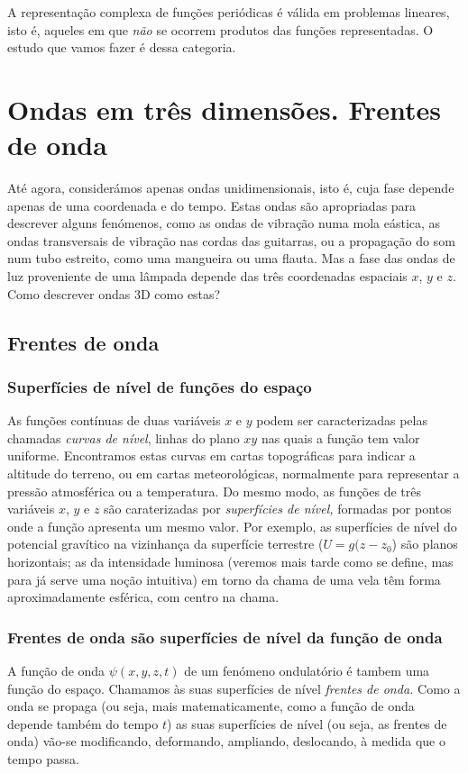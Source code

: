 A representação complexa de funções periódicas é válida em problemas lineares,
isto é, aqueles em que \emph{não} se ocorrem produtos das funções representadas.
O estudo que vamos fazer é dessa categoria.

\section{Ondas em três dimensões. Frentes de onda}
Até agora, considerámos apenas ondas unidimensionais, isto é, cuja fase depende
apenas de uma coordenada e do tempo. Estas ondas são apropriadas para descrever
alguns fenómenos, como as ondas de vibração numa mola eástica, as ondas
transversais de vibração nas cordas das guitarras, ou a propagação do som num
tubo estreito, como uma mangueira ou uma flauta. Mas a fase das ondas de luz
proveniente de uma lâmpada depende das três coordenadas espaciais $x$, $y$ e
$z$. Como descrever ondas 3D como estas?



\subsection{Frentes de onda}
\subsubsection*{Superfícies de nível de funções do espaço}
As funções contínuas de duas variáveis $x$ e $y$ podem ser caracterizadas pelas
chamadas \emph{curvas de nível}, linhas do plano $xy$ nas quais a função tem
valor uniforme. Encontramos estas curvas em cartas topográficas para indicar a
altitude do terreno, ou em cartas meteorológicas, normalmente para representar a
pressão atmosférica ou a temperatura. Do mesmo modo, as funções de três
variáveis $x$, $y$ e $z$ são caraterizadas por \emph{superfícies de nível,}
formadas por pontos onde a função apresenta um mesmo valor. Por exemplo, as
superfícies de nível do potencial gravítico na vizinhança da superfície
terrestre ($U=g(z-z_0$) são planos horizontais; as da intensidade luminosa
(veremos mais tarde como se define, mas para já serve uma noção intuitiva) em
torno da chama de uma vela têm forma aproximadamente esférica, com centro na
chama.

\subsubsection*{Frentes de onda são superfícies de nível da função de onda}
A função de onda $\psi(x,y,z,t)$ de um fenómeno ondulatório é tambem uma função
do espaço. Chamamos às suas superfícies de nível \emph{frentes de onda.} Como a
onda se propaga (ou seja, mais matematicamente, como a função de onda depende
também do tempo $t$) as suas superfícies de nível (ou seja, as frentes de onda)
vão-se modificando, deformando, ampliando, deslocando, à medida que o tempo
passa.

